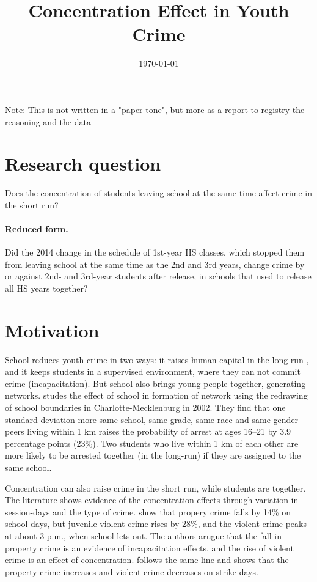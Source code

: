 \documentclass[11pt]{article}
\begin{document}
\title{Concentration Effect in Youth Crime}
\author{}
\date{\today}
\maketitle
Note: This is not written in a "paper tone", but more as a report to registry the reasoning and the data
\section{Research question}

\noindent Does the concentration of students leaving school at the same time
affect crime in the short run?

\paragraph{Reduced form.} Did the 2014 change in the schedule of 1st-year HS
classes, which stopped them from leaving school at the same time as the 2nd
and 3rd years, change crime by or against 2nd- and 3rd-year students after
release, in schools that used to release all HS years together?

 \section{Motivation}

School reduces youth crime in two ways: it raises human capital in the long
run \citep{lochner2004}, and it keeps students in a supervised environment, where they can not commit crime 
(incapacitation). But school also brings young people
together, generating networks. \citet{billings2019} studes the effect of school in formation of network using the redrawing of
school boundaries in Charlotte-Mecklenburg in 2002. They find that one standard
deviation more same-school, same-grade, same-race and same-gender peers living
within 1 km raises the probability of arrest at ages 16--21 by 3.9 percentage
points (23\%). Two students who live within 1 km of each other are 
more likely to be arrested together (in the long-run) if they are assigned to the
same school.

Concentration can also raise crime in the short run, while students are
together. The literature shows evidence of the concentration effects through variation in session-days and the
type of crime. \citet{jacob2003} show that propery crime falls by 14\% on school days, but juvenile
violent crime rises by 28\%, and the violent crime peaks at about 3 p.m.,
when school lets out. The authors arugue that the fall in property crime is an evidence of incapacitation effects,
 and the rise of violent crime is an effect of concentration.  \citet{luallen2006} follows the same line and shows that the
property crime increases
 and violent crime decreases on strike days. 
\end{document}
